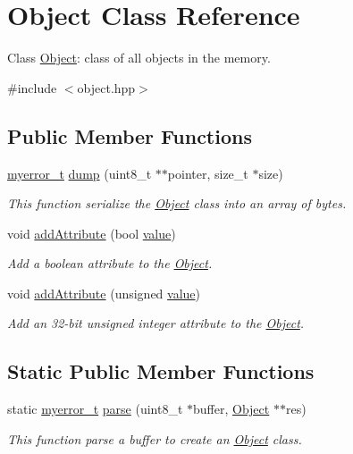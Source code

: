 \hypertarget{classObject}{}\section{Object Class Reference}
\label{classObject}


Class \hyperlink{classObject}{Object}\+: class of all objects in the memory.  




{\ttfamily \#include $<$object.\+hpp$>$}

\subsection*{Public Member Functions}
\begin{DoxyCompactItemize}
\item 
\hyperlink{error_8hpp_acabd2917084445509becf54ab64a4bd0}{myerror\+\_\+t} \hyperlink{classObject_a2b49276b8fba5a1ed308353194a073be}{dump} (uint8\+\_\+t $\ast$$\ast$pointer, size\+\_\+t $\ast$size)
\begin{DoxyCompactList}\small\item\em This function serialize the \hyperlink{classObject}{Object} class into an array of bytes. \end{DoxyCompactList}\item 
void \hyperlink{classObject_a4526a87a2bd9267d43c44370dbc4f038}{add\+Attribute} (bool \hyperlink{classObject_a528d047a03a99189b3f993eefe31ef9f}{value})
\begin{DoxyCompactList}\small\item\em Add a boolean attribute to the \hyperlink{classObject}{Object}. \end{DoxyCompactList}\item 
void \hyperlink{classObject_ab80b20e22d10bd0ac02252228fa63178}{add\+Attribute} (unsigned \hyperlink{classObject_a528d047a03a99189b3f993eefe31ef9f}{value})
\begin{DoxyCompactList}\small\item\em Add an 32-\/bit unsigned integer attribute to the \hyperlink{classObject}{Object}. \end{DoxyCompactList}\end{DoxyCompactItemize}
\subsection*{Static Public Member Functions}
\begin{DoxyCompactItemize}
\item 
static \hyperlink{error_8hpp_acabd2917084445509becf54ab64a4bd0}{myerror\+\_\+t} \hyperlink{classObject_afc62e204f1b86ff45f06a2fe4f675381}{parse} (uint8\+\_\+t $\ast$buffer, \hyperlink{classObject}{Object} $\ast$$\ast$res)
\begin{DoxyCompactList}\small\item\em This function parse a buffer to create an \hyperlink{classObject}{Object} class. \end{DoxyCompactList}\end{DoxyCompactItemize}
